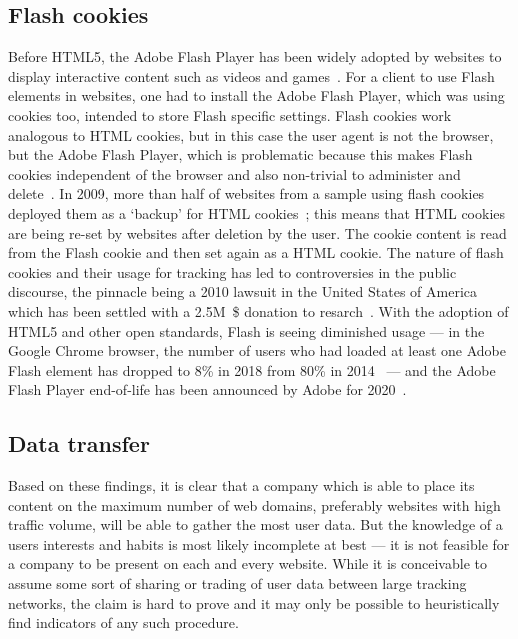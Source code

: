 \subsection{Flash cookies}\label{section:flash-cookies}
Before HTML5, the Adobe Flash Player has been widely adopted by websites to display interactive content such as videos and games~\cite{flash-adoption}.
For a client to use Flash elements in websites, one had to install the Adobe Flash Player,
which was using cookies too, intended to store Flash specific settings.
Flash cookies work analogous to HTML cookies, but in this case the user agent is not the browser, but the Adobe Flash Player,
which is problematic because this makes Flash cookies independent of the browser and also non-trivial to administer and delete~\cite{flash-privacy}.
In 2009, more than half of websites from a sample using flash cookies deployed them as a `backup' for HTML cookies~\cite{flash-html-backup};
this means that HTML cookies are being re-set by websites after deletion by the user.
The cookie content is read from the Flash cookie and then set again as a HTML cookie.
The nature of flash cookies and their usage for tracking has led to controversies in the public discourse,
the pinnacle being a 2010 lawsuit in the United States of America which
has been settled with a 2.5M~\$ donation to resarch~\cite{flash-lawsuit}\cite{flash-lawsuit-settlement}.
With the adoption of HTML5 and other open standards,
Flash is seeing diminished usage --- in the Google Chrome browser, the number of users who had loaded at least one Adobe Flash element has dropped to 8\% in 2018 from 80\% in 2014~\cite{flash-keynote} --- and the Adobe Flash Player end-of-life has been announced by Adobe for 2020~\cite{flash-eol}.

\subsection{Data transfer}
Based on these findings, it is clear that a company which is able to place its content on the maximum number of web domains,
preferably websites with high traffic volume, will be able to gather the most user data.
But the knowledge of a users interests and habits is most likely incomplete at best --- it is not feasible for a company to be present on each and every website.
While it is conceivable to assume some sort of sharing or trading of user data between large tracking networks,
the claim is hard to prove and it may only be possible to heuristically find indicators of any such procedure. 

